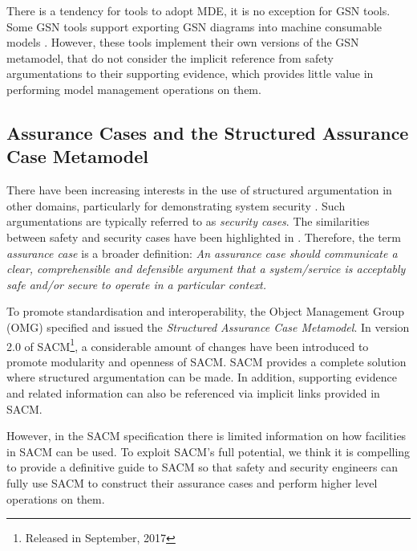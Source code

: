 There is a tendency for tools to adopt MDE, it is no exception for GSN tools. Some GSN tools support exporting GSN diagrams into machine consumable models \cite{}. However, these tools implement their own versions of the GSN metamodel, that do not consider the implicit reference from safety argumentations to their supporting evidence, which provides little value in performing model management operations on them.


%

\subsection{Assurance Cases and the Structured Assurance Case Metamodel}
There have been increasing interests in the use of structured argumentation in other domains, particularly for demonstrating system security \cite{}. Such argumentations are typically referred to as \textit{security cases}. The similarities between safety and security cases have been highlighted in \cite{}. Therefore, the term \textit{assurance case} is a broader definition: \textit{An assurance case should communicate a clear, comprehensible and defensible argument that a system/service is acceptably safe and/or secure to operate in a particular context.} 

To promote standardisation and interoperability, the Object Management Group (OMG) specified and issued the \textit{Structured Assurance Case Metamodel}. In version 2.0 of SACM\footnote{Released in September, 2017}, a considerable amount of changes have been introduced to promote modularity and openness of SACM. SACM provides a complete solution where structured argumentation can be made. In addition, supporting evidence and related information can also be referenced via implicit links provided in SACM.

However, in the SACM specification there is limited information on how facilities in SACM can be used. To exploit SACM's full potential, we think it is compelling to provide a definitive guide to SACM so that safety and security engineers can fully use SACM to construct their assurance cases and perform higher level operations on them. 

